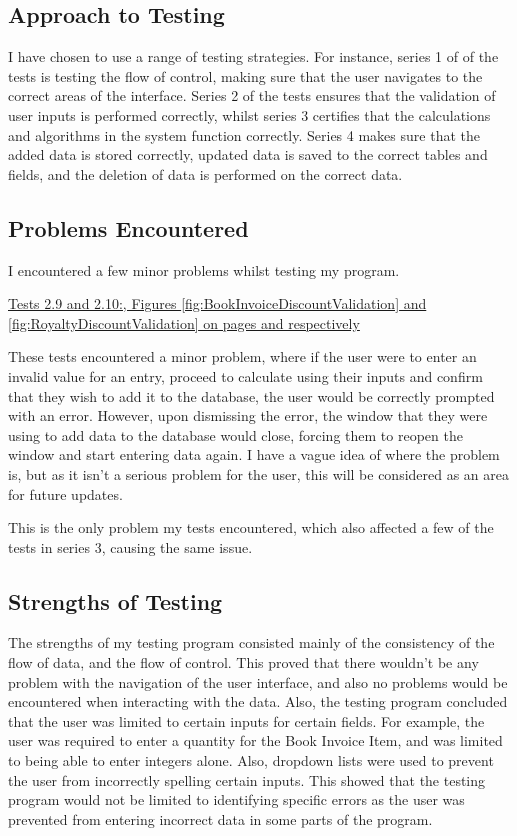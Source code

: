 \subsection{Approach to Testing}

I have chosen to use a range of testing strategies. For instance, series 1 of of the tests is testing the flow of control, making sure that the user navigates to the correct areas of the interface. Series 2 of the tests ensures that the validation of user inputs is performed correctly, whilst series 3 certifies that the calculations and algorithms in the system function correctly. Series 4 makes sure that the added data is stored correctly, updated data is saved to the correct tables and fields, and the deletion of data is performed on the correct data. 

\subsection{Problems Encountered}

I encountered a few minor problems whilst testing my program.

\underline{Tests 2.9 and 2.10:, Figures \ref{fig:BookInvoiceDiscountValidation} and \ref{fig:RoyaltyDiscountValidation} on pages \pageref{fig:BookInvoiceDiscountValidation} and \pageref{fig:RoyaltyDiscountValidation} respectively}

These tests encountered a minor problem, where if the user were to enter an invalid value for an entry, proceed to calculate using their inputs and confirm that they wish to add it to the database, the user would be correctly prompted with an error. However, upon dismissing the error, the window that they were using to add data to the database would close, forcing them to reopen the window and start entering data again. I have a vague idea of where the problem is,  but as it isn't a serious problem for the user, this will be considered as an area for future updates. 

This is the only problem my tests encountered, which also affected a few of the tests in series 3, causing the same issue.


\subsection{Strengths of Testing}

The strengths of my testing program consisted mainly of the consistency of the flow of data, and the flow of control. This proved that there wouldn't be any problem with the navigation of the user interface, and also no problems would be encountered when interacting with the data. Also, the testing program concluded that the user was limited to certain inputs for certain fields. For example, the user was required to enter a quantity for the Book Invoice Item, and was limited to being able to enter integers alone. Also, dropdown lists were used to prevent the user from incorrectly spelling certain inputs. This showed that the testing program would not be limited to identifying specific errors as the user was prevented from entering incorrect data in some parts of the program.

